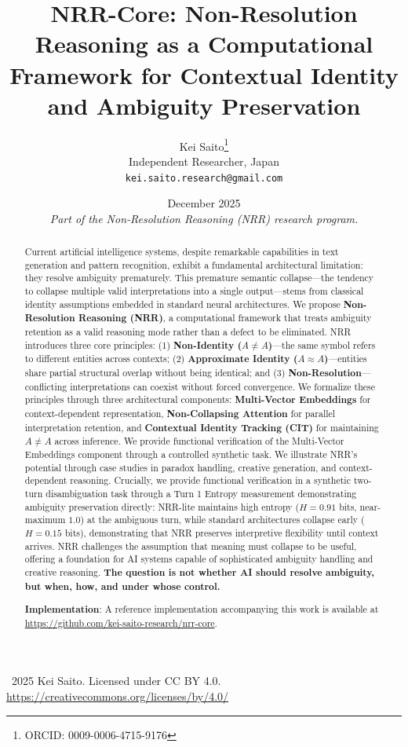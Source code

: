 \documentclass[11pt,a4paper]{article}
\title{\textbf{NRR-Core: Non-Resolution Reasoning as a Computational Framework for Contextual Identity and Ambiguity Preservation}}
\author{
  Kei Saito\thanks{ORCID: 0009-0006-4715-9176} \\
  Independent Researcher, Japan \\
  \texttt{kei.saito.research@gmail.com}
}
\date{December 2025 \\[0.5em]
\textit{Part of the Non-Resolution Reasoning (NRR) research program.}}
\begin{document}
\maketitle

\begin{center}
\textcopyright\ 2025 Kei Saito.
Licensed under CC BY 4.0.\\
\url{https://creativecommons.org/licenses/by/4.0/}
\end{center}

\begin{abstract}
Current artificial intelligence systems, despite remarkable capabilities in text generation and pattern recognition, exhibit a fundamental architectural limitation: they resolve ambiguity prematurely.
This premature semantic collapse---the tendency to collapse multiple valid interpretations into a single output---stems from classical identity assumptions embedded in standard neural architectures.
We propose \textbf{Non-Resolution Reasoning (NRR)}, a computational framework that treats ambiguity retention as a valid reasoning mode rather than a defect to be eliminated.
NRR introduces three core principles: (1) \textbf{Non-Identity ($A \neq A$)}---the same symbol refers to different entities across contexts;
(2) \textbf{Approximate Identity ($A \approx A$)}---entities share partial structural overlap without being identical;
and (3) \textbf{Non-Resolution}---conflicting interpretations can coexist without forced convergence.
We formalize these principles through three architectural components: \textbf{Multi-Vector Embeddings} for context-dependent representation, \textbf{Non-Collapsing Attention} for parallel interpretation retention, and \textbf{Contextual Identity Tracking (CIT)} for maintaining $A \neq A$ across inference.
We provide functional verification of the Multi-Vector Embeddings component through a controlled synthetic task.
We illustrate NRR's potential through case studies in paradox handling, creative generation, and context-dependent reasoning.
Crucially, we provide functional verification in a synthetic two-turn disambiguation task through a Turn 1 Entropy measurement demonstrating ambiguity preservation directly: NRR-lite maintains high entropy ($H = 0.91$ bits, near-maximum $1.0$) at the ambiguous turn, while standard architectures collapse early ($H = 0.15$ bits), demonstrating that NRR preserves interpretive flexibility until context arrives.
NRR challenges the assumption that meaning must collapse to be useful, offering a foundation for AI systems capable of sophisticated ambiguity handling and creative reasoning.
\textbf{The question is not whether AI should resolve ambiguity, but when, how, and under whose control.}

\textbf{Implementation}: A reference implementation accompanying this work 
is available at \url{https://github.com/kei-saito-research/nrr-core}.
\end{abstract}
\end{document}

